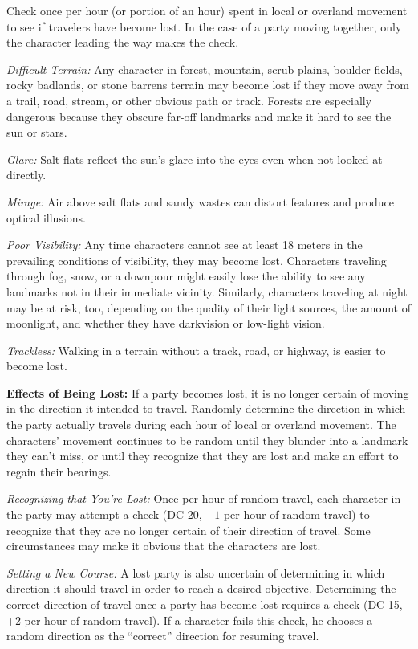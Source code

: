 Check once per hour (or portion of an hour) spent in local or overland movement to see if travelers have become lost. In the case of a party moving together, only the character leading the way makes the check.

\textit{Difficult Terrain:} Any character in forest, mountain, scrub plains, boulder fields, rocky badlands, or stone barrens terrain may become lost if they move away from a trail, road, stream, or other obvious path or track. Forests are especially dangerous because they obscure far-off landmarks and make it hard to see the sun or stars.

\textit{Glare:} Salt flats reflect the sun's glare into the eyes even when not looked at directly.

\textit{Mirage:} Air above salt flats and sandy wastes can distort features and produce optical illusions.

\textit{Poor Visibility:} Any time characters cannot see at least 18 meters in the prevailing conditions of visibility, they may become lost. Characters traveling through fog, snow, or a downpour might easily lose the ability to see any landmarks not in their immediate vicinity. Similarly, characters traveling at night may be at risk, too, depending on the quality of their light sources, the amount of moonlight, and whether they have darkvision or low-light vision.

\textit{Trackless:} Walking in a terrain without a track, road, or highway, is easier to become lost.

\textbf{Effects of Being Lost:} If a party becomes lost, it is no longer certain of moving in the direction it intended to travel. Randomly determine the direction in which the party actually travels during each hour of local or overland movement. The characters' movement continues to be random until they blunder into a landmark they can't miss, or until they recognize that they are lost and make an effort to regain their bearings.

\textit{Recognizing that You're Lost:} Once per hour of random travel, each character in the party may attempt a  check (DC 20, $-1$ per hour of random travel) to recognize that they are no longer certain of their direction of travel. Some circumstances may make it obvious that the characters are lost.

\textit{Setting a New Course:} A lost party is also uncertain of determining in which direction it should travel in order to reach a desired objective. Determining the correct direction of travel once a party has become lost requires a  check (DC 15, +2 per hour of random travel). If a character fails this check, he chooses a random direction as the ``correct'' direction for resuming travel.

